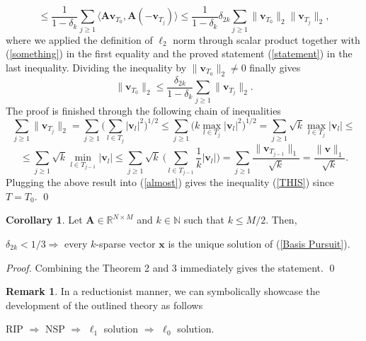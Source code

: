 \documentclass[11pt,oneside,czech,american]{book} %
\theoremstyle{plain}
\theoremstyle{definition}
\newtheorem{rmrk}{Remark}
\newtheorem{coro}{Corollary}
\begin{document}
\begin{equation*}
	\leq \frac{1}{{1-\delta_k}} \sum_{j\geq 1}\langle\bm{A}\bm{v}_{T_0},\bm{A}(-\bm{v}_{T_j})\rangle \leq \frac{1}{1-\delta_{k}} \delta_{2k} \sum_{j\geq 1} \lVert \bm{v}_{T_0}\rVert_2 \lVert \bm{v}_{T_j}\rVert_2,
\end{equation*}
where we applied the definition of $\ell_{2}$ norm through scalar product together with (\ref{something})  in the first equality and the proved statement (\ref{statement}) in the last inequality. Dividing the inequality by $\lVert\bm{v}_{T_0}\rVert_2 \neq 0$ finally gives
\begin{equation}
	\lVert\bm{v}_{T_0}\rVert_2 \leq \frac{\delta_{2k}}{1-\delta_{k}} \sum_{j\geq 1} \lVert \bm{v}_{T_j}\rVert_2. \label{almost}
\end{equation}
The proof is finished through the following chain of inequalities
\begin{equation*}
	\sum_{j\geq 1} \lVert\bm{v}_{T_j}\rVert_2 = \sum_{j\geq 1} \Big( \sum_{l \in T_j} |\bm{v}_l|^2 \Big)^{1/2} \leq \sum_{j\geq 1} \Big( k \max_{l \in T_j} |\bm{v}_l|^2 \Big)^{1/2} = \sum_{j\geq 1} \sqrt k \max_{l \in T_j} |\bm{v}_l| \leq 
\end{equation*}
\begin{equation}
	\leq	\sum_{j\geq 1} \sqrt k \min_{l \in T_{j-1}} |\bm{v}_l|
	\leq \sum_{j\geq 1} \sqrt k \ \Big( \sum_{l \in T_{j-1}} \frac{1}{k} |\bm{v}_l| \Big) = \sum_{j\geq 1} \frac{\lVert \bm{v}_{T_{j-1}}\rVert_1}{\sqrt k} = \frac{\lVert \bm{v} \rVert_1}{\sqrt k}.
	\label{chain}
\end{equation}
Plugging the above result into (\ref{almost}) gives the inequality (\ref{THIS}) since $T = T_0$.
\qed

\begin{coro}
	Let $\bm{A} \in \mathbb{R}^{N \times M}$ and $k \in \mathbb{N}$ such that $k \leq M/2$. Then,
	\begin{center}
		$\delta_{2k} < 1/3 \Rightarrow$  every $k$-sparse vector $\bm{x}$ is the unique solution of (\ref{Basis Pursuit}).
	\end{center}
\end{coro}
\emph{Proof.} Combining the Theorem 2 and 3 immediately gives the statement.
\qed

\begin{rmrk}
	In a reductionist manner, we can symbolically showcase the development of the outlined theory as follows
	\begin{center}
		RIP $\Rightarrow$ NSP $\Rightarrow$ $\ell_{1}$ solution $\Rightarrow$ $\ell_{0}$ solution.
	\end{center}
\end{rmrk}
\end{document}
